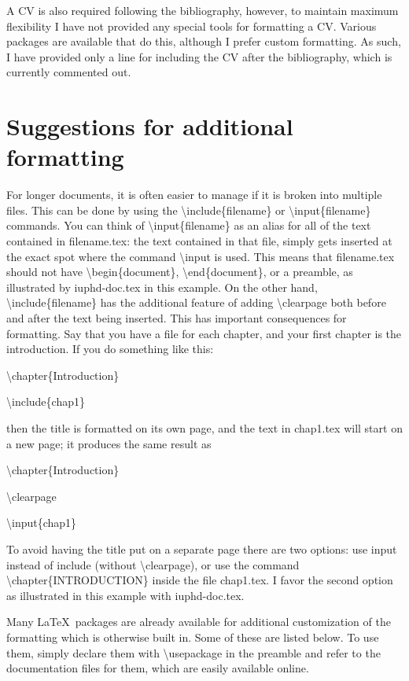 \documentclass{iuphd}
\begin{document}
A CV is also required following the bibliography, however, to maintain maximum flexibility I have not provided any special tools for
formatting a CV.  Various packages are available that do this, although I prefer custom formatting. As such, I have provided only a
line for including the CV after the bibliography, which is currently commented out.



\section{Suggestions for additional formatting}

For longer documents, it is often easier to manage if it is broken into multiple files.  This can be done by using the
\textbackslash include\{filename\} or \textbackslash input\{filename\} commands.  You can think of
\textbackslash input\{filename\} as an alias for all of the text contained in filename.tex: the text contained in that file,
simply gets inserted at the exact spot where the command \textbackslash input is used.  This means that filename.tex should not have
\textbackslash begin\{document\}, \textbackslash end\{document\}, or a preamble, as illustrated by iuphd-doc.tex in this example.
On the other hand, \textbackslash include\{filename\} has the additional feature of adding \textbackslash clearpage both before and after
the text being inserted.  This has important consequences for formatting.  Say that you have a file for each chapter,
and your first chapter is the introduction.  If you do something like this:
\medskip

\textbackslash chapter\{Introduction\}

\textbackslash include\{chap1\}
\medskip

\noindent then the title is formatted on its own page, and the text in chap1.tex will start on a new page; it produces
the same result as
\medskip

\textbackslash chapter\{Introduction\}

\textbackslash clearpage

\textbackslash input\{chap1\}
\medskip

\noindent To avoid having the title put on a separate page there are two options: use input instead of include
(without \textbackslash clearpage), or use the command \textbackslash chapter\{INTRODUCTION\} inside the file chap1.tex.
I favor the second option as illustrated in this example with iuphd-doc.tex.

Many \LaTeX \ packages are already available for additional customization of the formatting which is otherwise built in.
Some of these are listed below.  To use them, simply declare them with \textbackslash usepackage in the preamble
and refer to the documentation files for them, which are easily available online.
\end{document}
